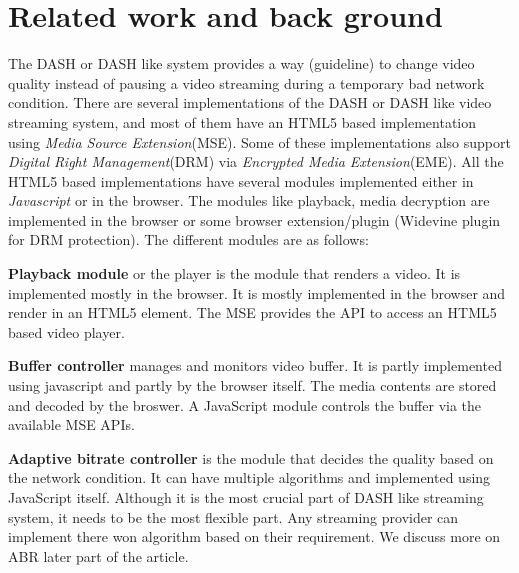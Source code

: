 \section{Related work and back ground}

The DASH or DASH like system provides a way (guideline) to change video quality instead of pausing a video streaming during a temporary bad network condition. There are several implementations of the DASH or DASH like video streaming system, and most of them have an HTML5 based implementation using {\it Media Source Extension}(MSE)\cite{wiki:dash,w3c:mse}. Some of these implementations also support {\it Digital Right Management}(DRM) via {\it Encrypted Media Extension}(EME)\cite{w3c:eme}. All the HTML5 based implementations have several modules implemented either in {\it Javascript} or in the browser. The modules like playback, media decryption are implemented in the browser or some browser extension/plugin (\ie Widevine plugin for DRM protection). The different modules are as follows:

{\bf Playback module} or the player is the module that renders a video. It is implemented mostly in the browser. It is mostly implemented in the browser and render in an HTML5 element. The MSE provides the API to access an HTML5 based video player.

{\bf Buffer controller} manages and monitors video buffer. It is partly implemented using javascript and partly by the browser itself. The media contents are stored and decoded by the broswer. A JavaScript module controls the buffer via the available MSE APIs.

{\bf Adaptive bitrate controller} is the module that decides the quality based on the network condition. It can have multiple algorithms and implemented using JavaScript itself. Although it is the most crucial part of DASH like streaming system, it needs to be the most flexible part. Any streaming provider can implement there won algorithm based on their requirement. We discuss more on ABR later part of the article.

